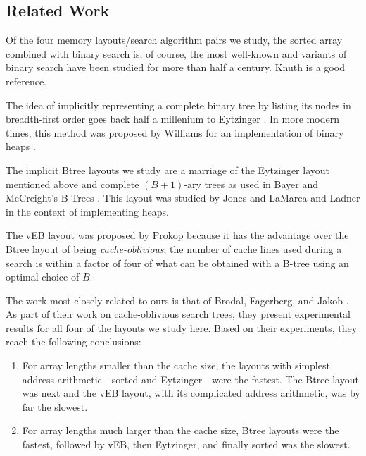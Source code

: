 \documentclass{patmorin}
\begin{document}
\subsection{Related Work}

Of the four memory layouts/search algorithm pairs we study, the sorted
array combined with binary search is, of course, the most well-known
and variants of binary search have been studied for more than half a
century. Knuth \cite[Section~6.2.1]{knuth:art} is a good reference.

The idea of implicitly representing a complete binary tree by listing
its nodes in breadth-first order goes back half a millenium to Eytzinger
\cite{eytzinger:thesaurus}. In more modern times, this method was proposed by
Williams for an implementation of binary heaps \cite{williams:algorithm}.

The implicit Btree layouts we study are a marriage of the Eytzinger layout
mentioned above and complete $(B+1)$-ary trees as used in Bayer and
McCreight's B-Trees \cite{bayer.mccreight:organization}.  This layout
was studied by Jones \cite{jones:empirical} and LaMarca and Ladner
\cite{lamarca.ladner:influence} in the context of implementing heaps.

The vEB layout was proposed by Prokop
\cite[Section~10.2]{prokop:cache-oblivious} because it has the advantage
over the Btree layout of being \emph{cache-oblivious}; the number of
cache lines used during a search is within a factor of four of what can
be obtained with a B-tree using an optimal choice of $B$.


The work most closely related to ours is that of Brodal, Fagerberg,
and Jakob \cite{brodal.fagerberg.ea:cache}. As part of their work on
cache-oblivious search trees, they present experimental results for
all four of the layouts we study here.  Based on their experiments,
they reach the following conclusions:

\begin{enumerate}

\item For array lengths smaller than the cache size, the layouts with
simplest address arithmetic---sorted and Eytzinger---were the fastest. The
Btree layout was next and the vEB layout, with its complicated address
arithmetic, was by far the slowest.

\item For array lengths much larger than the cache size, Btree layouts
were the fastest, followed by vEB, then Eytzinger, and finally sorted
was the slowest.
\end{enumerate}
\end{document}
